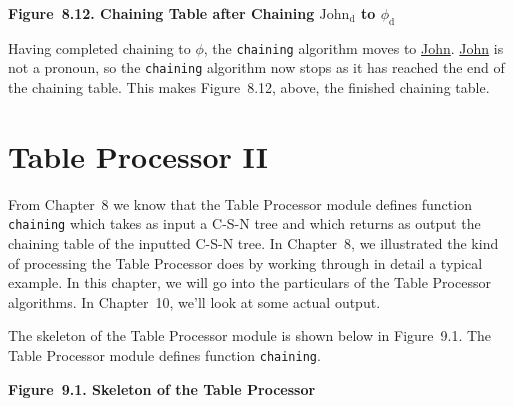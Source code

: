 \documentclass{article}
\begin{document}
\begin{minipage}{\textwidth}
{
}
\bigbreak
\textbf{Figure~8.12. Chaining Table after Chaining \underline{${\textrm{John}_{\textrm{d}}}$} to \underline{${\phi_{\textrm{d}}}$}}
\end{minipage}
\bigbreak

Having completed chaining to \underline{${\phi}$}, the
\texttt{chaining} algorithm moves to
\underline{John}. \underline{John} is not a pronoun, so the
\texttt{chaining} algorithm now stops as it has reached the end
of the chaining table. This makes Figure~8.12, above, the
finished chaining table.

%
%

\section{Table Processor II}

From Chapter~8 we know that the Table Processor module defines
function \texttt{chaining} which takes as input a C-S-N tree and
which returns as output the chaining table of the inputted C-S-N
tree. In Chapter~8, we illustrated the kind of processing the
Table Processor does by working through in detail a typical
example. In this chapter, we will go into the particulars of the
Table Processor algorithms. In Chapter~10, we'll look at some
actual output.

The skeleton of the Table Processor module is shown below in
Figure~9.1. The Table Processor module defines function
\texttt{chaining}.

\bigbreak
\begin{minipage}{\textwidth}
\vbox{}
\bigbreak
{}
\textbf{Figure~9.1. Skeleton of the Table Processor}
\end{minipage}
\bigbreak
\end{document}
